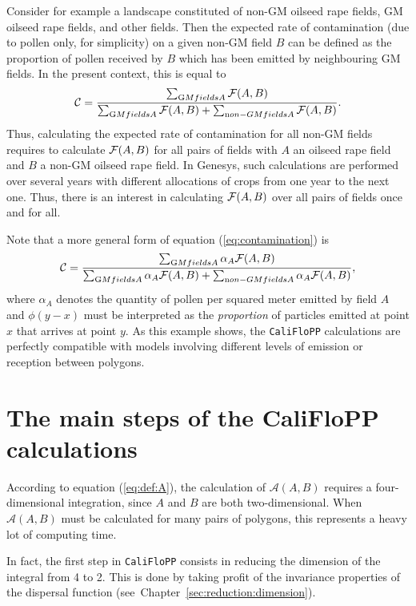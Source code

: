 Consider for example a landscape constituted of non-GM oilseed rape
fields, GM oilseed rape fields, and other fields. Then the expected rate
of contamination (due to pollen only, for simplicity) on a given non-GM
field $B$ can be defined as the proportion of pollen received by $B$
which has been emitted by neighbouring GM fields. In the present
context, this is equal to
\begin{equation}
\label{eq:contamination}
  {\cal C} = \frac{\sum_{{\mathrm GM fields }A} \A(A,B)}%
{\sum_{{\mathrm GM fields }A} \A(A,B) + \sum_{{\mathrm non-GM fields }A} \A(A,B)}.
\end{equation}
Thus, calculating the expected rate of contamination for all non-GM
fields requires to calculate ${\cal F}(A,B)$ for all pairs of fields with
$A$ an oilseed rape field and $B$ a non-GM oilseed rape field. In
Genesys, such calculations are performed over several years with
different allocations of crops from one year to the next one. Thus,
there is an interest in calculating ${\cal F}(A,B)$ over all pairs of fields
once and for all.

Note that a more general form of equation (\ref{eq:contamination}) is
\begin{equation*}
  {\cal C} = \frac{\sum_{{\mathrm GM fields }A} \alpha_A \A(A,B)}%
{\sum_{{\mathrm GM fields }A} \alpha_A\A(A,B) + \sum_{{\mathrm non-GM
      fields }A} \alpha_A\A(A,B)},
\end{equation*}
where $\alpha_A$ denotes the quantity of pollen per squared meter
emitted by field $A$ and $\phi(y-x)$ must be interpreted as the
\emph{proportion} of particles emitted at point $x$ that arrives
at point $y$. As this example shows, the \verb+CaliFloPP+ calculations
are perfectly compatible with models involving different levels of
emission or reception between polygons.

\section{The main steps of the CaliFloPP calculations}
According to equation (\ref{eq:def:A}), the calculation of
$\mathcal{A}(A,B)$ requires a four-dimensional integration, since $A$
and $B$ are both two-dimensional. When $\mathcal{A}(A,B)$ must be
calculated for many pairs of polygons, this represents a heavy lot of
computing time.

\medskip

In fact, the first step in \verb+CaliFloPP+ consists in reducing the
dimension of the integral from 4 to 2. This is done by taking profit of
the invariance properties of the dispersal function
(see~Chapter~\ref{sec:reduction:dimension}). 

